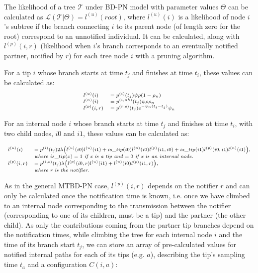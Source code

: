 \documentclass[a4paper,10pt]{article}
\begin{document}
The likelihood of a tree $\mathscr{T}$ under BD-PN model with parameter values $\Theta$ can be calculated as $\mathscr{L}(\mathscr{T}|\Theta) = l^{(u)}(root)$, where $l^{(u)}(i)$ is a likelihood of node $i$'s subtree if the branch connecting $i$ to its parent node (of length zero for the root) correspond to an unnotified individual. It can be calculated, along with $l^{(p)}(i, r)$ (likelihood when $i$'s branch corresponds to an eventually notified partner, notified by $r$) for each tree node $i$ with a pruning algorithm.


For a tip $i$ whose branch starts at time $t_j$ and finishes at time $t_i$, these values can be calculated as:
\begin{equation}
\scriptsize
\begin{array}{ll}
l^{(u)}(i) &= p^{(i)}(t_j)\psi\rho (1-\rho_{n})\\
l^{(n)}(i) &= p^{(i,nh)}(t_j)\psi\rho \rho_{n}\\
l^{(p)}(i, r) &= p^{(r,o)}(t_j)e^{-\psi_n (t_i - t_j)}\psi_{n}\\
\end{array}
\end{equation}

For an internal node $i$ whose branch starts at time $t_j$ and finishes at time $t_i$, with two child nodes, $i0$ and $i1$, these values can be calculated as:

\begin{equation}
\scriptsize
\begin{array}{ll}
l^{(u)}(i) &= p^{(i)}(t_j) 2\lambda 
\Big(l^{(u)}(i0)l^{(u)}(i1) 
+ is\_tip(i0) l^{(n)}(i0)l^{(p)}(i1,i0)
+ is\_tip(i1) l^{(p)}(i0,i1)l^{(n)}(i1)\Big),\\
& \textit{where } is\_tip(x) = 1 \textit{ if x is a tip and $= 0$ if x is an internal node.}\\
l^{(p)}(i, r) &= p^{(i,o)}(t_j) \lambda\Big(l^{(p)}(i0,r)l^{(u)}(i1) + l^{(u)}(i0)l^{(p)}(i1,r)\Big),\\
& \textit{where r is the notifier.}\\
\end{array}
\end{equation}

As in the general MTBD-PN case, $l^{(p)}(i, r)$ depends on the notifier $r$ and can only be calculated once the notification time is known, i.e. once we have climbed to an internal node corresponding to the transmission between the notifier (corresponding to one of its children, must be a tip) and the partner (the other child). As only the contributions coming from the partner tip branches depend on the notification times, while climbing the tree for each internal node $i$ and the time of its branch start $t_j$, we can store an array of pre-calculated values for notified internal paths for each of its tips (e.g. $a$), describing the tip's sampling time $t_a$ and a configuration $C(i,a)$: 
\end{document}
